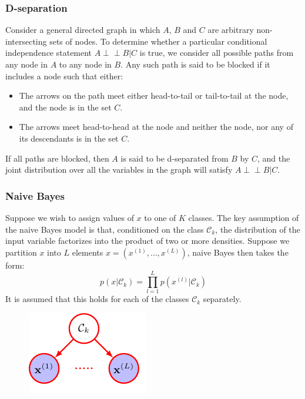 \documentclass{beamer}
\newcommand{\ind}{\perp\!\!\!\!\perp}
\begin{document}
\begin{frame}
    \frametitle{D-separation}
    Consider a general directed graph in which $A$, $B$ and $C$ are arbitrary non-intersecting sets of nodes. To determine whether a particular conditional independence statement $A\ind{}B|C$ is true, we consider all possible paths from any node in $A$ to any node in $B$. Any such path is said to be blocked if it includes a node such that either:
    \begin{itemize}
        \item The arrows on the path meet either head-to-tail or tail-to-tail at the node, and the node is in the set $C$.
        \item The arrows meet head-to-head at the node and neither the node, nor any of its descendants is in the set $C$.
    \end{itemize}
    If all paths are blocked, then $A$ is said to be d-separated from $B$ by $C$, and the joint distribution over all the variables in the graph will satisfy $A\ind{}B|C$.
\end{frame}

\begin{frame}
    \frametitle{Naive Bayes}
    Suppose we wish to assign values of $x$ to one of $K$ classes. The key assumption of the naive Bayes model is that, conditioned on the class $\mathcal{C}_{k}$, the distribution of the input variable factorizes into the product of two or more densities. Suppose we partition $x$ into $L$ elements $x=(x^{(1)},\hdots,x^{(L)})$, naive Bayes then takes the form:
    \begin{equation*}
        p(x|\mathcal{C}_{k})=\prod_{l=1}^{L}p(x^{(l)}|\mathcal{C}_{k})
    \end{equation*}
    It is assumed that this holds for each of the classes $\mathcal{C}_{k}$ separately.
    \begin{figure}
        \includegraphics{Figure_22.pdf}
    \end{figure}
\end{frame}
\end{document}
